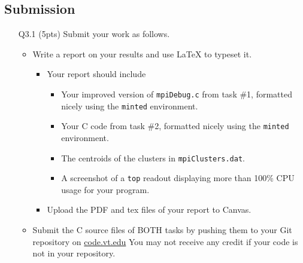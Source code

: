 \subsection*{Submission}

\begin{itemize}
    \item[Q3.1] (5pts) Submit your work as follows.
    \begin{itemize}
        \item Write a report on your results and use \LaTeX{} to typeset it.
        \begin{itemize}
            \item  Your report should include
            \begin{itemize}
                \item Your improved version of \texttt{mpiDebug.c} from task \#1, formatted nicely using the \texttt{minted} environment.
                \item Your C code from task \#2, formatted nicely using the \texttt{minted} environment.
                \item The centroids of the clusters in \texttt{mpiClusters.dat}.
                \item A screenshot of a \texttt{top} readout displaying more than 100\% CPU usage for your program.
            \end{itemize}
            \item Upload the PDF and tex files of your report to Canvas.
        \end{itemize}
        \item Submit the C source files of BOTH tasks by pushing them to your Git repository on \href{http://code.vt.edu}{code.vt.edu}
        You may not receive any credit if your code is not in your repository.
    \end{itemize}
\end{itemize}